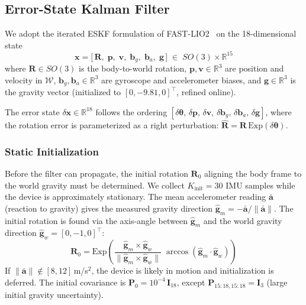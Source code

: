 \subsection{Error-State Kalman Filter}
\label{sec:eskf}

We adopt the iterated ESKF formulation of FAST-LIO2~\cite{xu2022fastlio2} on the 18-dimensional state
\begin{equation}
    \mathbf{x} = \bigl[\,\mathbf{R},\;\mathbf{p},\;\mathbf{v},\;\mathbf{b}_g,\;\mathbf{b}_a,\;\mathbf{g}\,\bigr]
    \;\in\; SO(3) \times \mathbb{R}^{15}
    \label{eq:state}
\end{equation}
where $\mathbf{R} \in SO(3)$ is the body-to-world rotation, $\mathbf{p},\mathbf{v} \in \mathbb{R}^3$ are position and velocity in $\mathcal{W}$, $\mathbf{b}_g,\mathbf{b}_a \in \mathbb{R}^3$ are gyroscope and accelerometer biases, and $\mathbf{g} \in \mathbb{R}^3$ is the gravity vector (initialized to $[0,-9.81,0]^\top$, refined online).

The error state $\delta\mathbf{x} \in \mathbb{R}^{18}$ follows the ordering
$[\delta\boldsymbol{\theta},\,\delta\mathbf{p},\,\delta\mathbf{v},\,\delta\mathbf{b}_g,\,\delta\mathbf{b}_a,\,\delta\mathbf{g}]$,
where the rotation error is parameterized as a right perturbation: $\hat{\mathbf{R}} = \mathbf{R}\,\mathrm{Exp}(\delta\boldsymbol{\theta})$.

\subsubsection{Static Initialization}
\label{sec:static_init}

Before the filter can propagate, the initial rotation $\mathbf{R}_0$ aligning the body frame to the world gravity must be determined.
We collect $K_\text{init} = 30$ IMU samples while the device is approximately stationary.
The mean accelerometer reading $\bar{\mathbf{a}}$ (reaction to gravity) gives the measured gravity direction $\hat{\mathbf{g}}_m = -\bar{\mathbf{a}} / \|\bar{\mathbf{a}}\|$.
The initial rotation is found via the axis-angle between $\hat{\mathbf{g}}_m$ and the world gravity direction $\hat{\mathbf{g}}_w = [0,-1,0]^\top$:
\begin{equation}
    \mathbf{R}_0 = \mathrm{Exp}\!\left(\frac{\hat{\mathbf{g}}_m \times \hat{\mathbf{g}}_w}{\|\hat{\mathbf{g}}_m \times \hat{\mathbf{g}}_w\|}\;\arccos(\hat{\mathbf{g}}_m \cdot \hat{\mathbf{g}}_w)\right)
    \label{eq:static_init}
\end{equation}
If $\|\bar{\mathbf{a}}\| \notin [8,12]$\,m/s$^2$, the device is likely in motion and initialization is deferred.
The initial covariance is $\mathbf{P}_0 = 10^{-4}\,\mathbf{I}_{18}$, except $\mathbf{P}_{15{:}18,15{:}18} = \mathbf{I}_3$ (large initial gravity uncertainty).

